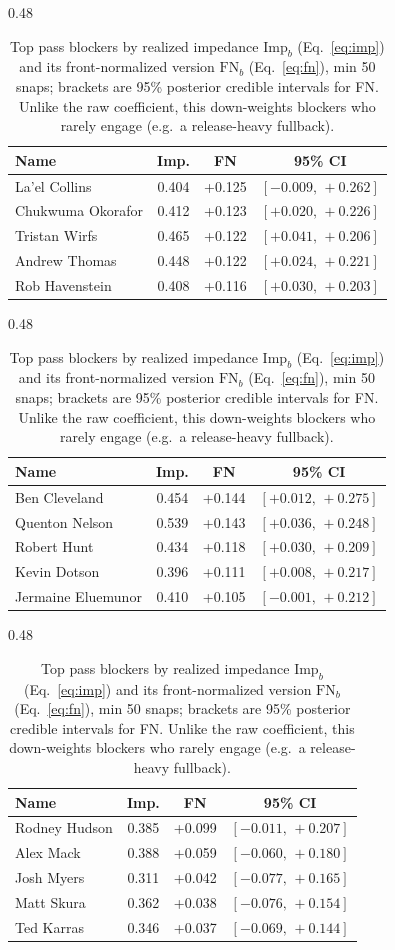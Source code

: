 \begin{table}[h!]
\centering
\begin{subtable}{0.48\textwidth}
\centering
\footnotesize
\begin{tabular}{lccc}
\toprule
Name & Imp. & FN & 95\% CI \\
\midrule
La'el Collins & 0.404 & +0.125 & $[-0.009,\,+0.262]$ \\
Chukwuma Okorafor & 0.412 & +0.123 & $[+0.020,\,+0.226]$ \\
Tristan Wirfs & 0.465 & +0.122 & $[+0.041,\,+0.206]$ \\
Andrew Thomas & 0.448 & +0.122 & $[+0.024,\,+0.221]$ \\
Rob Havenstein & 0.408 & +0.116 & $[+0.030,\,+0.203]$ \\
\bottomrule
\end{tabular}
\caption{T}
\end{subtable}
\hfill
\begin{subtable}{0.48\textwidth}
\centering
\footnotesize
\begin{tabular}{lccc}
\toprule
Name & Imp. & FN & 95\% CI \\
\midrule
Ben Cleveland & 0.454 & +0.144 & $[+0.012,\,+0.275]$ \\
Quenton Nelson & 0.539 & +0.143 & $[+0.036,\,+0.248]$ \\
Robert Hunt & 0.434 & +0.118 & $[+0.030,\,+0.209]$ \\
Kevin Dotson & 0.396 & +0.111 & $[+0.008,\,+0.217]$ \\
Jermaine Eluemunor & 0.410 & +0.105 & $[-0.001,\,+0.212]$ \\
\bottomrule
\end{tabular}
\caption{G}
\end{subtable}

\bigskip
\begin{subtable}{0.48\textwidth}
\centering
\footnotesize
\begin{tabular}{lccc}
\toprule
Name & Imp. & FN & 95\% CI \\
\midrule
Rodney Hudson & 0.385 & +0.099 & $[-0.011,\,+0.207]$ \\
Alex Mack & 0.388 & +0.059 & $[-0.060,\,+0.180]$ \\
Josh Myers & 0.311 & +0.042 & $[-0.077,\,+0.165]$ \\
Matt Skura & 0.362 & +0.038 & $[-0.076,\,+0.154]$ \\
Ted Karras & 0.346 & +0.037 & $[-0.069,\,+0.144]$ \\
\bottomrule
\end{tabular}
\caption{C}
\end{subtable}
\caption{Top pass blockers by realized impedance $\mathrm{Imp}_b$ (Eq.~\ref{eq:imp}) and its front-normalized version $\mathrm{FN}_b$ (Eq.~\ref{eq:fn}), min 50 snaps; brackets are 95\% posterior credible intervals for FN. Unlike the raw coefficient, this down-weights blockers who rarely engage (e.g.\ a release-heavy fullback).}
\label{tab:blocker_value}
\end{table}
